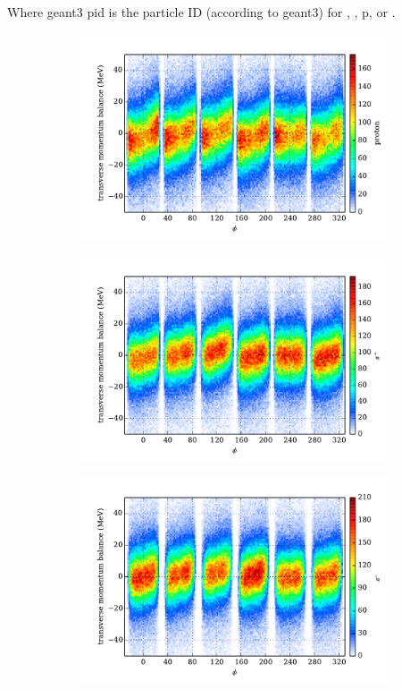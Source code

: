 Where geant3 pid is the particle ID (according to geant3) for \π[+], \π[-], p, \K[+] or \K[-].

\begin{figure}\begin{center}
\begin{subfigure}{0.4\columnwidth}
    \includegraphics[width=\columnwidth]{figures/pcor/pcor_mptbal_p.pdf}
\end{subfigure}
\begin{subfigure}{0.4\columnwidth}
    \includegraphics[width=\columnwidth]{figures/pcor/pcor_mptbal_pip.pdf}
\end{subfigure}
\begin{subfigure}{0.4\columnwidth}
    \includegraphics[width=\columnwidth]{figures/pcor/pcor_mptbal_pim.pdf}

\end{subfigure}
\end{center}
\end{figure}
